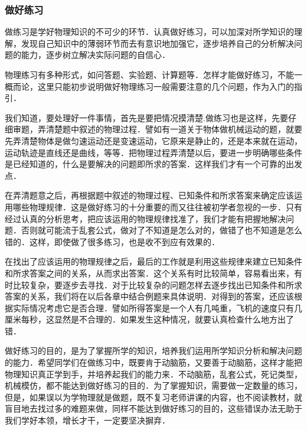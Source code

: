 \subsubsection*{做好练习}
做练习是学好物理知识的不可少的环节．认真做好练习，可以加深对所学知识的理解，发现自己知识中的薄弱环节而去有意识地加强它，逐步培养自己的分析解决问题的能力，逐步树立解决实际问题的自信心．

物理练习有多种形式，如问答题、实验题、计算题等．怎样才能做好练习，不能一概而论，这里只能初步说明做好物理练习一般需要注意的几个问题，作为入门的指引．

我们知道，要处理好一件事情，首先是要把情况摸清楚.做练习也是这样，先要仔细审题，弄清楚题中叙述的物理过程．譬如有一道关于物体做机械运动的题，就要先弄清楚物体是做匀速运动还是变速运动，它原来是静止的，还是本来就在运动，运动轨迹是直线还是曲线，等等．把物理过程弄清楚以后，要进一步明确哪些条件是已经知道的，什么是要解决的问题即所求的答案．这样我们才有一个可靠的出发点．

在弄清题意之后，再根据题中叙述的物理过程、已知条件和所求答案来确定应该运用哪些物理规律．这是做好练习的十分重要的而又往往被初学者忽视的一步．只有经过认真的分析思考，把应该运用的物理规律找准了，我们才能有把握地解决问题．否则就可能流于乱套公式，做对了不知道是怎么对的，做错了也不知道是怎么错的．这样，即使做了很多练习，也是收不到应有效果的．

在找出了应该运用的物理规律之后，最后的工作就是利用这些规律来建立已知条件和所求答案之间的关系，从而求出答案．这个关系有时比较简单，容易看出来，有时比较复杂，要逐步去寻找．对于比较复杂的问题怎样去逐步找出已知条件和所求答案的关系，我们将在以后各章中结合例题来具体说明．对得到的答案，还应该根据实际情况考虑它是否合理．譬如所得答案是一个人有几吨重，飞机的速度只有几厘米每秒，这显然是不合理的．如果发生这种情况，就要认真检查什么地方出了错．

做好练习的目的，是为了掌握所学的知识，培养我们运用所学知识分析和解决问题的能力．希望同学们在做练习中，既要肯于动脑筋，又要善于动脑筋，这样才能把物理知识真正学到手，并培养起我们的能力来．不动脑筋，乱套公式，死记类型，机械模仿，都不能达到做好练习的目的．为了掌握知识，需要做一定数量的练习，但是，如果误以为学物理就是做题，既不复习老师讲课的内容，也不阅读教材，就盲目地去找过多的难题来做，同样不能达到做好练习的目的，这些错误办法无助于我们学好本领，增长才干，一定要坚决摒弃．



















